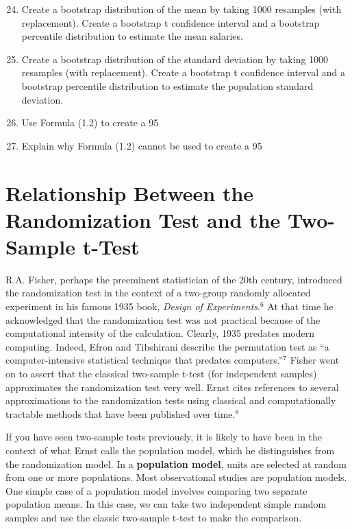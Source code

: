 \documentclass[
]{report}
\begin{document}
\begin{enumerate}
  \setcounter{enumi}{23} 
  \item Create a bootstrap distribution of the mean by taking 1000 resamples (with replacement). Create a bootstrap t confidence interval and a bootstrap percentile distribution to estimate the mean salaries.
  \item Create a bootstrap distribution of the standard deviation by taking 1000 resamples (with replacement). Create a bootstrap t confidence interval and a bootstrap percentile distribution to estimate the population standard deviation.
  \item Use Formula (1.2) to create a 95%
  \item Explain why Formula (1.2) cannot be used to create a 95%
\end{enumerate}

\section{\texorpdfstring{\textbf{Relationship Between the Randomization Test and the Two-Sample t-Test}}{Relationship Between the Randomization Test and the Two-Sample t-Test}}\label{relationship-between-the-randomization-test-and-the-two-sample-t-test}

R.A. Fisher, perhaps the preeminent statistician of the 20th century, introduced the randomization test in the context of a two-group randomly allocated experiment in his famous 1935 book, \emph{Design of Experiments}.\(^6\) At that time he acknowledged that the randomization test was not practical because of the computational
intensity of the calculation. Clearly, 1935 predates modern computing. Indeed, Efron and Tibshirani describe the permutation test as ``a computer-intensive statistical technique that predates computers.''\(^7\) Fisher went on to assert that the classical two-sample t-test (for independent samples) approximates the randomization test very well. Ernst cites references to several approximations to the randomization tests using classical and computationally tractable methods that have been published over time.\(^8\)

If you have seen two-sample tests previously, it is likely to have been in the context of what Ernst calls the population model, which he distinguishes from the randomization model. In a \textbf{population model}, units are selected at random from one or more populations. Most observational studies are population models. One simple case of a population model involves comparing two separate population means. In this case, we can take two independent simple random samples and use the classic two-sample t-test to make the comparison.
\end{document}
